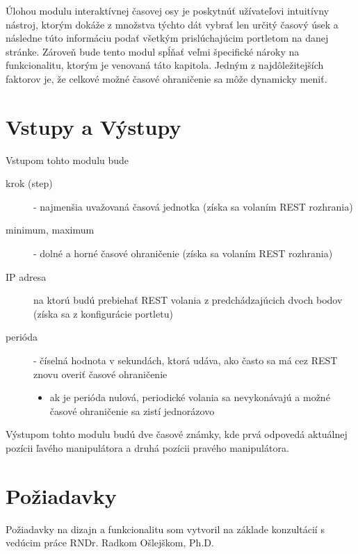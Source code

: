 \documentclass[
  digital, %
  twoside, %
  notable,   %
  nolof,   %
  nolot,   %
]{fithesis3}
\begin{document}
Úlohou modulu interaktívnej časovej osy je poskytnúť užívateľovi intuitívny nástroj, ktorým dokáže z množstva týchto dát vybrať len určitý časový úsek a následne túto informáciu podať všetkým prislúchajúcim portletom na danej stránke. Zároveň bude tento modul spĺňať veľmi špecifické nároky na funkcionalitu, ktorým je venovaná táto kapitola. Jedným z najdôležitejších faktorov je, že celkové možné časové ohraničenie sa môže dynamicky meniť.

\section{Vstupy a Výstupy}
Vstupom tohto modulu bude
\begin{description}
\item[krok (step)] - najmenšia uvažovaná časová jednotka (získa sa volaním REST rozhrania)
\item[minimum, maximum] - dolné a horné časové ohraničenie (získa sa volaním REST rozhrania)
\item[IP adresa] na ktorú budú prebiehať REST volania z predchádzajúcich dvoch bodov (získa sa z konfigurácie portletu)
\item[perióda] - číselná hodnota v sekundách, ktorá udáva, ako často sa má cez REST znovu overiť časové ohraničenie
\begin{itemize}
\item ak je perióda nulová, periodické volania sa nevykonávajú a možné časové ohraničenie sa zistí jednorázovo
\end{itemize}
\end{description}
Výstupom tohto modulu budú dve časové známky, kde prvá odpovedá aktuálnej pozícii ľavého manipulátora a druhá pozícii pravého manipulátora.

\section{Požiadavky}
\label{requirements}
Požiadavky na dizajn a funkcionalitu som vytvoril na základe konzultácií s vedúcim práce RNDr. Radkom Ošlejškom, Ph.D.
\end{document}
